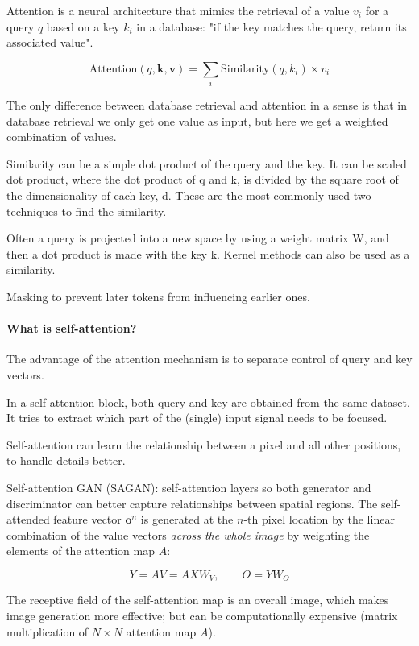 Attention is a neural architecture that mimics the retrieval of a value $v_i$ for a query $q$
based on a key $k_i$ in a database: "if the key matches the query, return its associated value".

$$\text{Attention}(q, \bm{k}, \bm{v}) = \sum_i{\text{Similarity}(q, k_i) \times v_i}$$

The only difference between database retrieval and attention in a sense is that in database
retrieval we only get one value as input, but here we get a weighted combination of values.

Similarity can be a simple dot product of the query and the key. It can be scaled dot product,
where the dot product of q and k, is divided by the square root of the dimensionality of each key, d.
These are the most commonly used two techniques to find the similarity.

Often a query is projected into a new space by using a weight matrix W, and then a dot product
is made with the key k. Kernel methods can also be used as a similarity.

Masking to prevent later tokens from influencing earlier ones.

\paragraph{What is self-attention?}

The advantage of the attention mechanism is to separate control of query and key vectors.

In a self-attention block, both query and key are obtained from the same dataset.
It tries to extract which part of the (single) input signal needs to be focused.

Self-attention can learn the relationship between a pixel and all other positions, to handle details better.

Self-attention GAN (SAGAN): self-attention layers so both generator and discriminator can better capture relationships between spatial regions.
The self-attended feature vector $\bm{o}^n$ is generated at the $n$-th pixel location
by the linear combination of the value vectors \textit{across the whole image}
by weighting the elements of the attention map $A$:

$$Y = AV = AX W_V, \qquad O = Y W_O$$

The receptive field of the self-attention map is an overall image,
which makes image generation more effective;
but can be computationally expensive (matrix multiplication of $N \times N$ attention map $A$).


